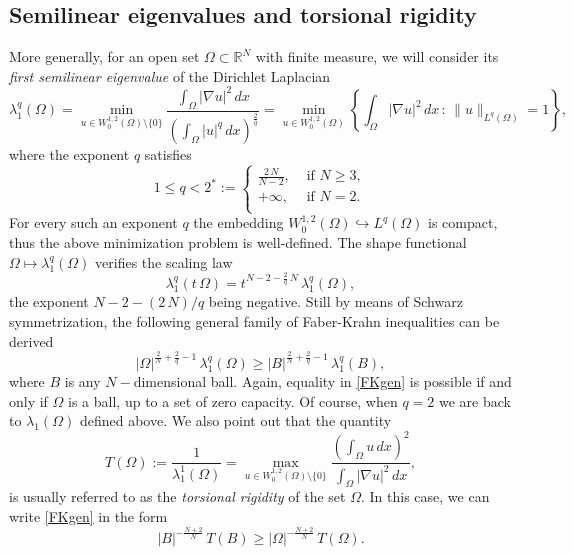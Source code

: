 \documentclass{amsart}
\theoremstyle{definition}
\numberwithin{equation}{section}
\begin{document}
\subsection{Semilinear eigenvalues and torsional rigidity} More generally, for an open set $\Omega\subset\mathbb{R}^N$ with finite measure, we will consider its {\it first semilinear eigenvalue} of the Dirichlet Laplacian
\begin{equation}
\label{autolavoro}
\lambda^q_{1}(\Omega)=\min_{u\in W^{1,2}_0(\Omega)\setminus\{0\}} \frac{\displaystyle\int_\Omega |\nabla u|^2\, dx}{\displaystyle\left(\int_\Omega |u|^q\, dx\right)^\frac{2}{q}}=\min_{u\in W^{1,2}_0(\Omega)}\left\{\int_\Omega |\nabla u|^2\, dx\, :\, \|u\|_{L^q(\Omega)}=1\right\},
\end{equation}
where the exponent $q$ satisfies
\begin{equation}
\label{q}
1\le q<2^*:=\left\{\begin{array}{rl}
\displaystyle \frac{2\,N}{N-2},&\mbox{ if } N\ge 3,\\
+\infty,& \mbox{ if }N=2.\\
\end{array}
\right.
\end{equation}
For every such an exponent $q$ the embedding $W^{1,2}_0(\Omega)\hookrightarrow L^q(\Omega)$ is compact, thus the above minimization problem is well-defined.
The shape functional $\Omega\mapsto \lambda_1^q(\Omega)$ verifies the scaling law
\[
\lambda^q_{1}(t\,\Omega)=t^{N-2-\frac{2}{q}\, N}\, \lambda_1^q(\Omega),
\]
the exponent $N-2-(2\,N)/q$ being negative. 
Still by means of Schwarz symmetrization, the following general family of Faber-Krahn inequalities can be derived 
\begin{equation}
\label{FKgen}
|\Omega|^{\frac{2}{N}+\frac{2}{q}-1}\, \lambda_1^q(\Omega)\ge |B|^{\frac{2}{N}+\frac{2}{q}-1}\, \lambda_1^q(B),
\end{equation}
where $B$ is any $N-$dimensional ball. Again, equality in \eqref{FKgen} is possible if and only if $\Omega$ is a ball, up to a set of zero capacity. Of course, when $q=2$ we are back to $\lambda_1(\Omega)$ defined above.
We also point out that the quantity 
\[
T(\Omega):=\frac{1}{\lambda^1_{1}(\Omega)}=\max_{u\in W^{1,2}_0(\Omega)\setminus\{0\}} \frac{\left(\displaystyle\int_\Omega u\, dx\right)^2}{\displaystyle\int_\Omega |\nabla u|^2\, dx}, 
\] 
is usually referred to as the {\it torsional rigidity} of the set $\Omega$. In this case, we can write \eqref{FKgen} in the form
\begin{equation}
\label{sv}
|B|^{-\frac{N+2}{N}}\,T(B)\ge|\Omega|^{-\frac{N+2}{N}}\,T(\Omega).
\end{equation}
\end{document}
